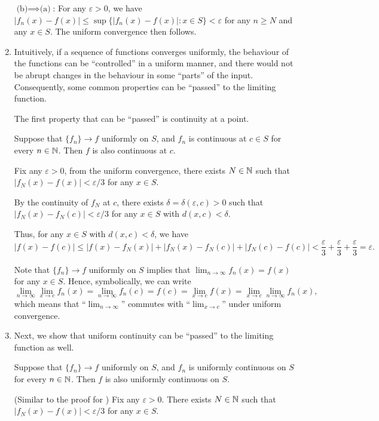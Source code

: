 \begin{enumerate}
\begin{pf}
\underline{\(\text{(b)}\implies \text{(a)}\)}: For any \(\varepsilon>0\), we
have \(|f_n(x)-f(x)|\le\sup\{|f_n(x)-f(x)|:x\in S\}<\varepsilon\) for any
\(n\ge N\) and any \(x\in S\). The uniform convergence then follows.
\end{pf}

\item Intuitively, if a sequence of functions converges uniformly, the
behaviour of the functions can be ``controlled'' in a uniform manner, and there
would not be abrupt changes in the behaviour in some ``parts'' of the input.
Consequently, some common properties can be ``passed'' to the limiting
function.

The first property that can be ``passed'' is continuity at a point.
\begin{proposition}
\label{prp:unif-conv-seq-cts}
Suppose that \(\{f_n\}\to f\) uniformly on \(S\), and \(f_n\) is continuous at
\(c\in S\) for every \(n\in\mathbb{N}\). Then \(f\) is also continuous at \(c\).
\end{proposition}
\begin{pf}
Fix any \(\varepsilon>0\), from the uniform convergence, there exists
\(N\in\mathbb{N}\) such that \(|f_N(x)-f(x)|<\varepsilon/3\) for any \(x\in S\).

By the continuity of \(f_N\) at \(c\), there exists
\(\delta=\delta(\varepsilon,c)>0\) such that \(|f_N(x)-f_N(c)|<\varepsilon/3\)
for any \(x\in S\) with \(d(x,c)<\delta\).

Thus, for any \(x\in S\) with \(d(x,c)<\delta\), we have
\[
|f(x)-f(c)|\le |f(x)-f_N(x)|+|f_N(x)-f_N(c)|+|f_N(c)-f(c)|
<\frac{\varepsilon}{3}+\frac{\varepsilon}{3}+\frac{\varepsilon}{3}
=\varepsilon.
\]
\end{pf}

\begin{note}
Note that \(\{f_n\}\to f\) uniformly on \(S\) implies that \(\lim_{n\to
\infty}f_n(x)=f(x)\) for any \(x\in S\). Hence, symbolically, we can write
\[
\lim_{n\to \infty}\lim_{x\to c}f_n(x)=\lim_{n\to \infty}f_n(c)
=f(c)=\lim_{x\to c}f(x)=\lim_{x\to c}\lim_{n\to \infty}f_n(x),
\]
which means that ``\(\lim_{n\to \infty}\)'' commutes with ``\(\lim_{x\to c}\)''
under uniform convergence.
\end{note}
\item Next, we show that uniform continuity can be ``passed'' to the limiting
function as well.
\begin{proposition}
\label{prp:unif-conv-seq-unif-cts}
Suppose that \(\{f_n\}\to f\) uniformly on \(S\), and \(f_n\) is uniformly
continuous on \(S\) for every \(n\in\mathbb{N}\). Then \(f\) is also uniformly
continuous on \(S\).
\end{proposition}
\begin{pf}
(Similar to the proof for ) Fix any
\(\varepsilon>0\). There exists \(N\in\mathbb{N}\) such that
\(|f_N(x)-f(x)|<\varepsilon/3\) for any \(x\in S\).


\end{pf}
\end{enumerate}
